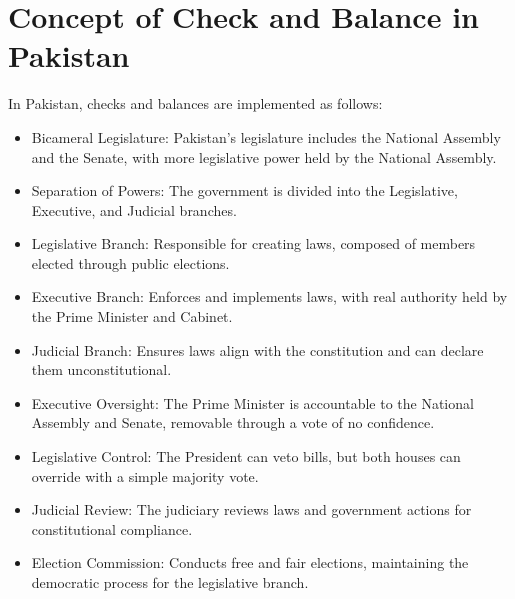 \documentclass{article}
\begin{document}
\section{Concept of Check and Balance in Pakistan}
In Pakistan, checks and balances are implemented as follows:

\begin{itemize}
  \item Bicameral Legislature: Pakistan's legislature includes the National Assembly and the Senate, with more legislative power held by the National Assembly.
  \item Separation of Powers: The government is divided into the Legislative, Executive, and Judicial branches.
  \item Legislative Branch: Responsible for creating laws, composed of members elected through public elections.
  \item Executive Branch: Enforces and implements laws, with real authority held by the Prime Minister and Cabinet.
  \item Judicial Branch: Ensures laws align with the constitution and can declare them unconstitutional.
  \item Executive Oversight: The Prime Minister is accountable to the National Assembly and Senate, removable through a vote of no confidence.
  \item Legislative Control: The President can veto bills, but both houses can override with a simple majority vote.
  \item Judicial Review: The judiciary reviews laws and government actions for constitutional compliance.
  \item Election Commission: Conducts free and fair elections, maintaining the democratic process for the legislative branch.
\end{itemize}
\end{document}
